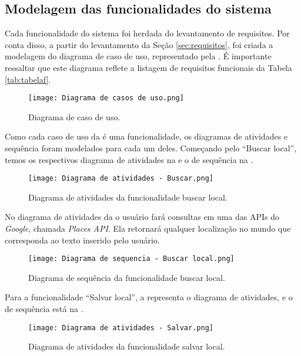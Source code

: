 \subsection{Modelagem das funcionalidades do sistema}
Cada funcionalidade do sistema foi herdada do levantamento de requisitos. Por conta disso, a partir do levantamento da Seção \ref{sec:requisitos}, foi criada a modelagem do diagrama de caso de uso, representado pela . É importante ressaltar que este diagrama reflete a listagem de requisitos funcionais da Tabela \ref{tab:tabelaf}.

\begin{figure}[!htb]
  \centering
  \texttt{[image: Diagrama de casos de uso.png]}
  \caption{Diagrama de caso de uso.}
  \label{fig:usecasesdiagram}
\end{figure}

Como cada caso de uso da  é uma funcionalidade, os diagramas de atividades e sequência foram modelados para cada um deles. Começando pelo “Buscar local”, temos os respectivos diagrama de atividades na  e o de sequência na .

\begin{figure}[!htb]
  \centering
  \texttt{[image: Diagrama de atividades - Buscar.png]}
  \caption{Diagrama de atividades da funcionalidade buscar local.}
  \label{fig:atividadebuscar}
\end{figure}

No diagrama de atividades da  o usuário fará consultas em uma das APIs do \textit{Google}, chamada \textit{Places API}. Ela retornará qualquer localização no mundo que corresponda ao texto inserido pelo usuário.

\begin{figure}[!htb]
  \centering
  \texttt{[image: Diagrama de sequencia - Buscar local.png]}
  \caption{Diagrama de sequência da funcionalidade buscar local.}
  \label{fig:sequenciabuscar}
\end{figure}

Para a funcionalidade “Salvar local”, a  representa o diagrama de atividades, e o de sequência está na .

\begin{figure}[!htb]
  \centering
  \texttt{[image: Diagrama de atividades - Salvar.png]}
  \caption{Diagrama de atividades da funcionalidade salvar local.}
  \label{fig:atividadesalvar}
\end{figure}

